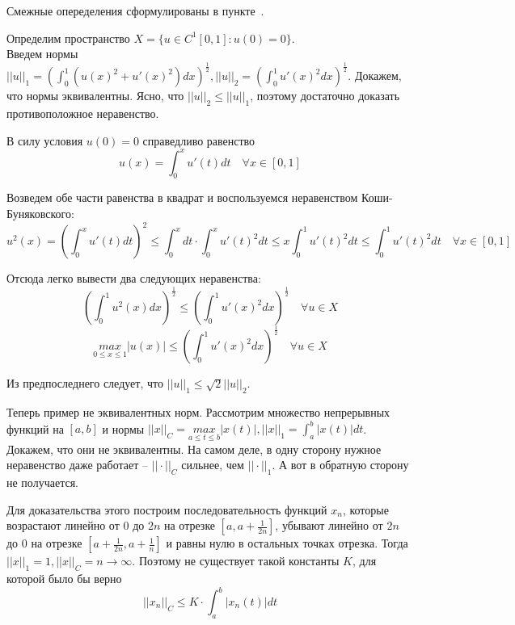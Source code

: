 \begin{note}
    Смежные опеределения сформулированы в пункте~.
\end{note}

\begin{example}
    Определим пространство $X = \{u \in C^1[0, 1] : u(0) = 0\}$.\\
    
    Введем нормы $||u||_1 = (\int_0^1(u(x)^2 + u'(x)^2)dx)^{\frac{1}{2}}, ||u||_2 = (\int_0^1u'(x)^2dx)^{\frac{1}{2}}$. Докажем, что нормы эквивалентны. Ясно, что $||u||_2 \leqslant ||u||_1$, поэтому достаточно доказать противоположное неравенство.

    В силу условия $u(0) = 0$ справедливо равенство $$u(x) = \int_0^xu'(t)dt \quad \forall x \in [0, 1]$$

    Возведем обе части равенства в квадрат и воспользуемся неравенством Коши-Буняковского: $$u^2(x) = \left(\int_0^xu'(t)dt \right)^2 \leqslant \int_0^xdt \cdot \int_0^x u'(t)^2dt \leqslant x \int_0^1u'(t)^2dt \leqslant \int_0^1u'(t)^2dt \quad \forall x \in [0, 1]$$

    Отсюда легко вывести два следующих неравенства:
    $$\left(\int_0^1u^2(x)dx\right)^{\frac{1}{2}} \leqslant \left(\int_0^1 u'(x)^2dx\right)^{\frac{1}{2}} \quad \forall u \in X$$
    $$\underset{0 \leqslant x \leqslant 1}{max}|u(x)| \leqslant \left(\int_0^1 u'(x)^2dx\right)^{\frac{1}{2}} \quad \forall u \in X$$

    Из предпоследнего следует, что $||u||_1 \leqslant \sqrt{2}||u||_2$.
\end{example}

\begin{example}
    Теперь пример не эквивалентных норм.
    Рассмотрим множество непрерывных функций на $[a, b]$ и нормы $||x||_C = \underset{a\leqslant t\leqslant b}{max}|x(t)|, ||x||_1 = \int_a^b|x(t)|dt$. Докажем, что они не эквивалентны. На самом деле, в одну сторону нужное неравенство даже работает -- $||\cdot||_C$ сильнее, чем $||\cdot||_1$. А вот в обратную сторону не получается. 
    
    Для доказательства этого построим последовательность функций $x_n$, которые возрастают линейно от $0$ до $2n$ на отрезке $[a, a+\frac{1}{2n}]$, убывают линейно от $2n$ до $0$ на отрезке $[a+\frac{1}{2n}, a+\frac{1}{n}]$ и равны нулю в остальных точках отрезка. Тогда $||x||_1 = 1, ||x||_C = n \to \infty$. Поэтому не существует такой константы $K$, для которой было бы верно 
    $$||x_n||_C \leqslant K \cdot \int_a^b|x_n(t)|dt$$
\end{example}

